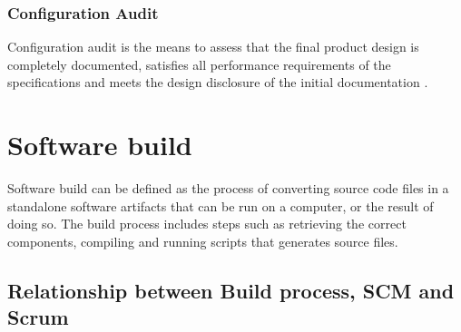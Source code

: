 \documentclass[../main.tex]{subfiles}
\begin{document}
\subsubsection{Configuration Audit}
Configuration audit is the means to assess that the final product design is completely documented, satisfies all performance requirements of the specifications and meets the design disclosure of the initial documentation \cite{ieestandard}.
\section{Software build}
Software build can be defined as the process of converting source code files in a standalone software artifacts that can be run on a computer, or the result of doing so. The build process includes steps such as retrieving the correct components, compiling and running scripts that generates source files.\\
\subsection{Relationship between Build process, SCM and Scrum}
\end{document}
